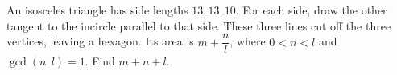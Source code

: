 An isosceles triangle has side lengths $13,13,10$. For each side, draw the other tangent to the incircle parallel to that side. These three lines cut off the three vertices, leaving a hexagon. Its area is $m+\dfrac{n}{l}$, where $0<n<l$ and $\gcd(n,l)=1$. Find $m+n+l$.
